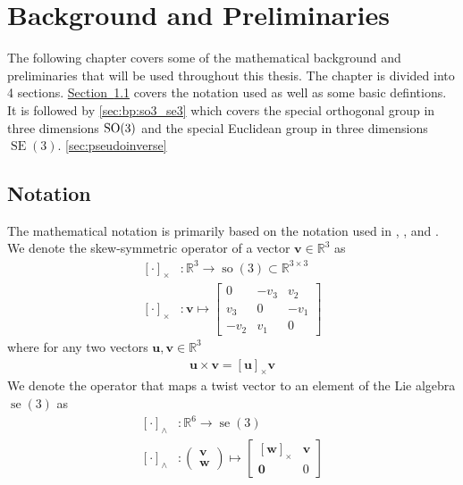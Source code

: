 \chapter{Background and Preliminaries}

The following chapter covers some of the mathematical background and preliminaries
that will be used throughout this thesis. The chapter is divided into 4 sections.
\hyperref[sec:bp:notation]{Section~\ref*{sec:bp:notation}} covers the notation used
as well as some basic defintions. It is followed by \autoref{sec:bp:so3_se3} which
covers the special orthogonal group in three dimensions $\operatorname{SO}(3)$ and the special
Euclidean group in three dimensions $\operatorname{SE}(3)$. \autoref{sec:pseudoinverse}

\section{Notation}
\label{sec:bp:notation}

The mathematical notation is primarily based on the notation used in \cite{modsim},
\cite{fossen2021}, and \cite{sola2017}. We denote the skew-symmetric operator
of a vector $\bm{v} \in \mathbb{R}^3$ as
\begin{subequations}
\begin{align}
    [\cdot]_{\times} &: \mathbb{R}^3 \to \operatorname{so}(3) \subset \mathbb{R}^{3\times 3} \\
    [\cdot]_{\times} &: \bm{v} \mapsto 
    \begin{bmatrix}
        0 & -v_3 & v_2 \\
        v_3 & 0 & -v_1 \\
        -v_2 & v_1 & 0
    \end{bmatrix}
\end{align}
\end{subequations}
where for any two vectors $\bm{u}, \bm{v} \in \mathbb{R}^3$
\begin{align}
    \bm{u} \times \bm{v} = [\bm{u}]_{\times} \bm{v}
\end{align}
We denote the operator that maps a twist vector to an element of the Lie algebra
$\operatorname{se}(3)$ as
\begin{subequations}
\begin{align}
    [\cdot]_{\wedge} &: \mathbb{R}^6 \to \operatorname{se}(3) \\
    [\cdot]_{\wedge} &: \begin{pmatrix} \bm{v} \\ \bm{w} \end{pmatrix} \mapsto
        \begin{bmatrix}
            [\bm{w}]_{\times} & \bm{v} \\
            \bm{0} & 0
        \end{bmatrix}
\end{align}
\end{subequations}

